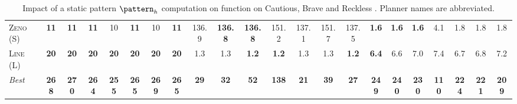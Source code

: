 \documentclass[11pt,landscape]{article}
\begin{document}
\begin{table}[tb]
{\begin{tabular}{|l||ccccccc||ccccccc||ccccccc||}
\textsc{Zeno} (S)&\textbf{11}&\textbf{11}&\textbf{11}&10&\textbf{11}&10&\textbf{11}&136.9&\textbf{136.8}&\textbf{136.8}&151.2&137.1&151.7&137.5&\textbf{1.6}&\textbf{1.6}&\textbf{1.6}&4.1&1.8&1.8&1.8\\
\textsc{Line} (L)&\textbf{20}&\textbf{20}&\textbf{20}&\textbf{20}&\textbf{20}&\textbf{20}&\textbf{20}&1.3&1.3&\textbf{1.2}&\textbf{1.2}&1.3&1.3&\textbf{1.2}&\textbf{6.4}&6.6&7.0&7.4&6.7&6.8&7.2
\\\hline
\textit{Best}&\textbf{268}&\textbf{270}&\textbf{264}&\textbf{255}&\textbf{265}&\textbf{269}&\textbf{265}&\textbf{29}&\textbf{32}&\textbf{52}&\textbf{138}&\textbf{21}&\textbf{39}&\textbf{27}&\textbf{249}&\textbf{240}&\textbf{230}&\textbf{110}&\textbf{224}&\textbf{221}&\textbf{209}\\\hline

        \end{tabular}}
        \caption{Impact of a static pattern $\pattern_h$ computation on function on Cautious, Brave and Reckless \pattyd. Planner names are abbreviated.}
        \label{tab:abl-patternh-static}
        \end{table}
        
\end{document}
